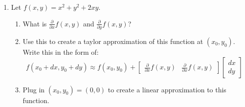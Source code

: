 \documentclass[12pt]{article}
\begin{document}
\begin{enumerate}
  \bigskip\bigskip
  \item Let $f(x, y) = x^2 + y^2 + 2xy$.
  \begin{enumerate}
    \item What is $\frac{\partial}{\partial x} f(x,y)$ and $\frac{\partial}{\partial y} f(x,y)$?
    
    \item Use this to create a taylor approximation of this function at $(x_0, y_0)$. Write this in the form of:
    $$
      f(x_0 + dx, y_0 + dy) \approx f(x_0, y_0) + \begin{bmatrix}\frac{\partial}{\partial x} f(x,y) & \frac{\partial}{\partial x} f(x,y)\end{bmatrix} \begin{bmatrix}dx \\ dy\end{bmatrix}
    $$

    \item Plug in $(x_0, y_0) = (0, 0)$ to create a linear approximation to this function.
  \end{enumerate}
\end{enumerate}
\end{document}
